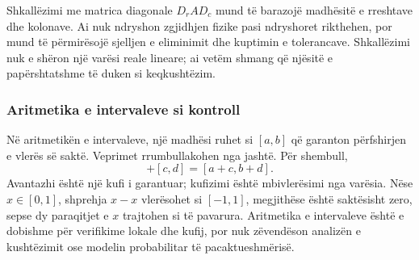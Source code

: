 Shkallëzimi me matrica diagonale $D_rAD_c$ mund të barazojë madhësitë e rreshtave dhe kolonave. Ai nuk ndryshon zgjidhjen fizike pasi ndryshoret rikthehen, por mund të përmirësojë sjelljen e eliminimit dhe kuptimin e tolerancave. Shkallëzimi nuk e shëron një varësi reale lineare; ai vetëm shmang që njësitë e papërshtatshme të duken si keqkushtëzim.

\subsubsection{Aritmetika e intervaleve si kontroll}
Në aritmetikën e intervaleve, një madhësi ruhet si $[a,b]$ që garanton përfshirjen e vlerës së saktë. Veprimet rrumbullakohen nga jashtë. Për shembull,
\begin{equation}
 [a,b]+[c,d]=[a+c,b+d].
\end{equation}
Avantazhi është një kufi i garantuar; kufizimi është mbivlerësimi nga varësia. Nëse $x\in[0,1]$, shprehja $x-x$ vlerësohet si $[-1,1]$, megjithëse është saktësisht zero, sepse dy paraqitjet e $x$ trajtohen si të pavarura. Aritmetika e intervaleve është e dobishme për verifikime lokale dhe kufij, por nuk zëvendëson analizën e kushtëzimit ose modelin probabilitar të pacaktueshmërisë.
